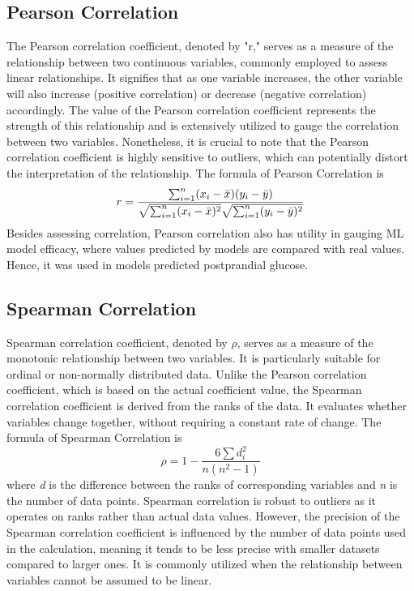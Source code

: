 \documentclass[12pt,a4paper,english
]{tunithesis}
\begin{document}
\subsection{Pearson Correlation}
The Pearson correlation coefficient, denoted by "r," serves as a measure of the relationship between two continuous variables, commonly employed to assess linear relationships. It signifies that as one variable increases, the other variable will also increase (positive correlation) or decrease (negative correlation) accordingly. The value of the Pearson correlation coefficient represents the strength of this relationship and is extensively utilized to gauge the correlation between two variables. Nonetheless, it is crucial to note that the Pearson correlation coefficient is highly sensitive to outliers, which can potentially distort the interpretation of the relationship. The formula of Pearson Correlation is
\begin{equation}
  r =
  \frac{ \sum_{i=1}^{n}(x_i-\bar{x})(y_i-\bar{y}) }{%
        \sqrt{\sum_{i=1}^{n}(x_i-\bar{x})^2}\sqrt{\sum_{i=1}^{n}(y_i-\bar{y})^2}}
\end{equation}
Besides assessing correlation, Pearson correlation also has utility in gauging ML model efficacy, where values predicted by models are compared with real values. Hence, it was used in models predicted postprandial glucose. \parencite{kirk2021} 

\subsection{Spearman Correlation}
Spearman correlation coefficient, denoted by \(\rho\), serves as a measure of the monotonic relationship between two variables. It is particularly suitable for ordinal or non-normally distributed data. Unlike the Pearson correlation coefficient, which is based on the actual coefficient value, the Spearman correlation coefficient is derived from the ranks of the data. It evaluates whether variables change together, without requiring a constant rate of change. The formula of Spearman Correlation is
\begin{equation}
    \rho = 1- {\frac {6 \sum d_i^2}{n(n^2 - 1)}}
\end{equation}
where \textit{d} is the difference between the ranks of corresponding variables and \textit{n} is the number of data points. Spearman correlation is robust to outliers as it operates on ranks rather than actual data values. However, the precision of the Spearman correlation coefficient is influenced by the number of data points used in the calculation, meaning it tends to be less precise with smaller datasets compared to larger ones. It is commonly utilized when the relationship between variables cannot be assumed to be linear.
\end{document}

